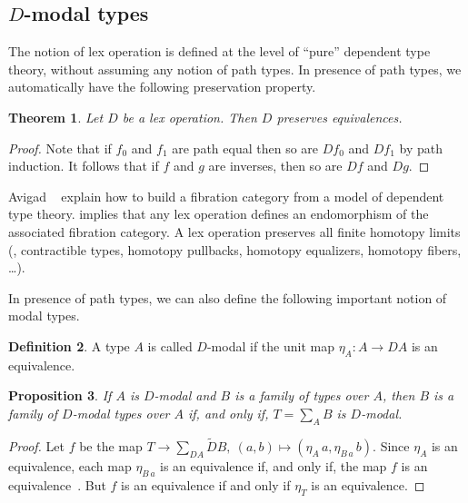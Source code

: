 \documentclass[10pt,a4paper,draft]{article}
\newcommand{\D}{D}              %
\newcommand{\DD}{\tilde{D}} %
\renewcommand{\~}{\widetilde}
\newtheorem{theorem}{Theorem}[section]
\newtheorem{proposition}[theorem]{Proposition}
\theoremstyle{definition}
\newtheorem{definition}[theorem]{Definition}
\theoremstyle{remark} %
\begin{document}
\subsection{\texorpdfstring{$\D$}{D}\hyp{}modal types}

The notion of lex operation is defined at the level of ``pure'' dependent type theory,
without assuming any notion of path types. In presence of path types, we automatically
have the following preservation property.

\begin{theorem}\label{lex}
  Let $\D$ be a lex operation.
  Then $\D$ preserves equivalences.
\end{theorem}

\begin{proof}
  Note that if $f_0$ and $f_1$ are path equal then so are $\D f_0$ and $\D f_1$ by path induction.
  It follows that if $f$ and $g$ are inverses, then so are $\D f$ and $\D g$.
\end{proof}

Avigad \etal~\cite{AvigadKL15} explain how to build a fibration category from a model of
dependent type theory.  implies that any lex operation defines an
endomorphism of the associated fibration category. A lex operation preserves
all finite homotopy limits (\eg, contractible types, homotopy pullbacks, homotopy equalizers, homotopy fibers, \ldots).

\medskip

In presence of path types, we can also define the following important notion of modal types.

\begin{definition}
  A type $A$ is called $\D$\hyp{}modal if the unit map $\eta_A:A\rightarrow \D A$ is an equivalence.
\end{definition}

\begin{proposition}\label{sum}
  If $A$ is $\D$\hyp{}modal and $B$ is a family of types over $A$, then
  $B$ is a family of $\D$\hyp{}modal types over $A$ if, and only if, $T = \sum_AB$ is $\D$\hyp{}modal.
\end{proposition}

\begin{proof}
  Let $f$ be the map
  $T\rightarrow \sum_{\D A}{\DD B},\ (a,b)\mapsto (\eta_A\,a,\eta_{B\,a}\,b)$.
  Since $\eta_A$ is an equivalence,
  each map $\eta_{B\,a}$ is an equivalence if, and only if, the map $f$ is an equivalence~\cite{HoTT}.
  But $f$ is an equivalence if and only if $\eta_{T}$ is an equivalence.
\end{proof}
\end{document}
